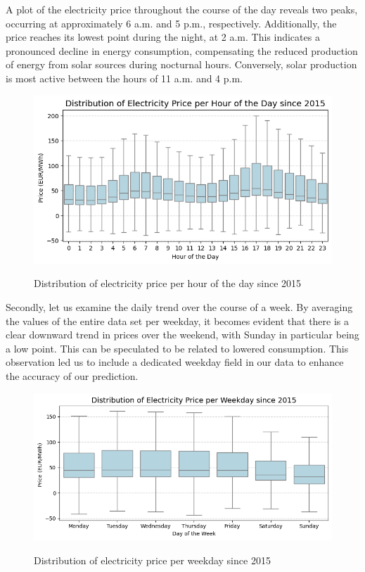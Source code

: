 \documentclass[a4paper]{article}
\begin{document}
A plot of the electricity price throughout the course of the day reveals
two peaks, occurring at approximately 6 a.m. and 5 p.m., respectively.
Additionally, the price reaches its lowest point during the night, at 2
a.m. This indicates a pronounced decline in energy consumption,
compensating the reduced production of energy from solar sources during
nocturnal hours. Conversely, solar production is most active between the
hours of 11 a.m. and 4 p.m.

\begin{figure}
\centering
{\includegraphics[keepaspectratio]{src/image-3.png}}
\caption{Distribution of electricity price per hour of the day since
2015}
\end{figure}

Secondly, let us examine the daily trend over the course of a week. By
averaging the values of the entire data set per weekday, it becomes
evident that there is a clear downward trend in prices over the weekend,
with Sunday in particular being a low point. This can be speculated to
be related to lowered consumption. This observation led us to include a
dedicated weekday field in our data to enhance the accuracy of our
prediction.

\begin{figure}
\centering
{\includegraphics[keepaspectratio]{src/image-4.png}}
\caption{Distribution of electricity price per weekday since 2015}
\end{figure}
\end{document}
